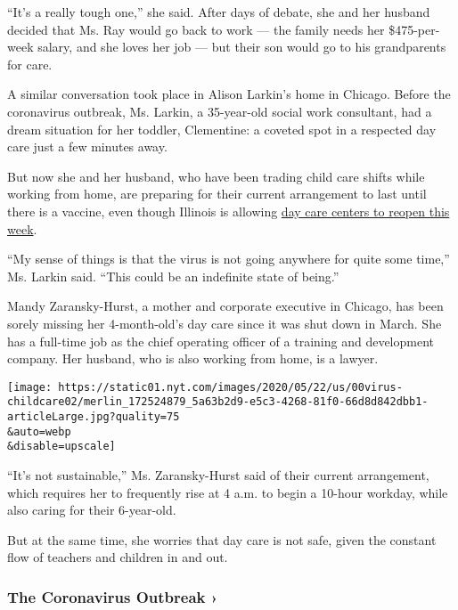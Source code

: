 ``It's a really tough one,'' she said. After days of debate, she and her
husband decided that Ms. Ray would go back to work --- the family needs
her \$475-per-week salary, and she loves her job --- but their son would
go to his grandparents for care.

A similar conversation took place in Alison Larkin's home in Chicago.
Before the coronavirus outbreak, Ms. Larkin, a 35-year-old social work
consultant, had a dream situation for her toddler, Clementine: a coveted
spot in a respected day care just a few minutes away.

But now she and her husband, who have been trading child care shifts
while working from home, are preparing for their current arrangement to
last until there is a vaccine, even though Illinois is allowing
\href{https://www.chicagotribune.com/coronavirus/ct-coronavirus-illinois-child-care-facilities-reopen-daycare-20200522-tbsreoatqfeblldhkx7lmfe3km-story.html}{day
care centers to reopen this week}.

``My sense of things is that the virus is not going anywhere for quite
some time,'' Ms. Larkin said. ``This could be an indefinite state of
being.''

Mandy Zaransky-Hurst, a mother and corporate executive in Chicago, has
been sorely missing her 4-month-old's day care since it was shut down in
March. She has a full-time job as the chief operating officer of a
training and development company. Her husband, who is also working from
home, is a lawyer.

\texttt{[image: https://static01.nyt.com/images/2020/05/22/us/00virus-childcare02/merlin\_172524879\_5a63b2d9-e5c3-4268-81f0-66d8d842dbb1-articleLarge.jpg?quality=75\\\&auto=webp\\\&disable=upscale]}

``It's not sustainable,'' Ms. Zaransky-Hurst said of their current
arrangement, which requires her to frequently rise at 4 a.m. to begin a
10-hour workday, while also caring for their 6-year-old.

But at the same time, she worries that day care is not safe, given the
constant flow of teachers and children in and out.

\href{https://www.nytimes.com/news-event/coronavirus?action=click\&pgtype=Article\&state=default\&region=MAIN_CONTENT_3\&context=storylines_faq}{}

\hypertarget{the-coronavirus-outbreak-}{%
\subsubsection{The Coronavirus Outbreak
›}\label{the-coronavirus-outbreak-}}

